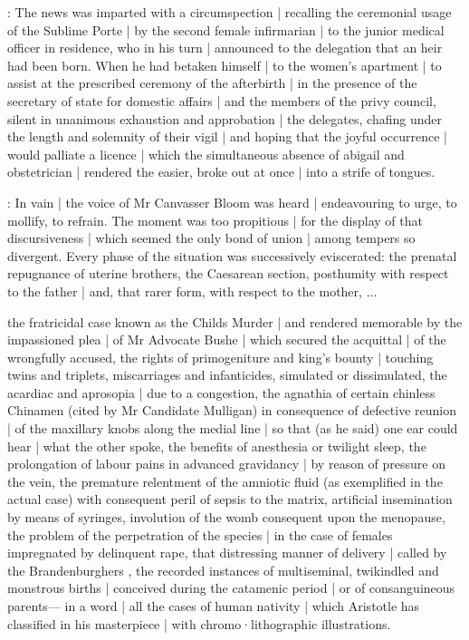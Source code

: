 

:
The news was imparted with a circumspection |
recalling the ceremonial usage of the Sublime Porte |
by the second female infirmarian |
to the junior medical officer in residence,
who in his turn |
announced to the delegation
that an heir had been born.
When he had betaken himself |
to the women's apartment |
to assist at the prescribed ceremony of the afterbirth |
in the presence of the secretary of state for domestic affairs |
and the members of the privy council,
silent in unanimous exhaustion and approbation |
the delegates,
chafing under the length and solemnity of their vigil |
and hoping that the joyful occurrence |
would palliate a licence |
which the simultaneous absence of abigail and obstetrician |
rendered the easier,
broke out at once |
into a strife of tongues.

:
In vain |
the voice of Mr Canvasser Bloom was heard |
endeavouring to urge,
to mollify,
to refrain.
The moment was too propitious |
for the display of that discursiveness |
which seemed the only bond of union |
among tempers so divergent.
Every phase of the situation was successively eviscerated:
the prenatal repugnance of uterine brothers,
the Caesarean section,
posthumity with respect to the father |
and,
that rarer form,
with respect to the mother,
...

\begin{omitted}
the fratricidal case known as the Childs Murder |
and rendered memorable by the impassioned plea |
of Mr Advocate Bushe |
which secured the acquittal |
of the wrongfully accused,
the rights of primogeniture and king's bounty |
touching twins and triplets,
miscarriages and infanticides,
simulated or dissimulated,
the acardiac  and aprosopia |
due to a congestion,
the agnathia of certain chinless Chinamen
(cited by Mr Candidate Mulligan)
in consequence of defective reunion |
of the maxillary knobs along the medial line |
so that
(as he said)
one ear could hear |
what the other spoke,
the benefits of anesthesia or twilight sleep,
the prolongation of labour pains in advanced gravidancy |
by reason of pressure on the vein,
the premature relentment of the amniotic fluid
(as exemplified in the actual case)
with consequent peril of sepsis to the matrix,
artificial insemination by means of syringes,
involution of the womb consequent upon the menopause,
the problem of the perpetration of the species |
in the case of females impregnated by delinquent rape,
that distressing manner of delivery |
called by the Brandenburghers ,
the recorded instances of multiseminal,
twikindled and monstrous births |
conceived during the catamenic period |
or of consanguineous parents---%
in a word |
all the cases of human nativity |
which Aristotle has classified in his masterpiece |
with chromo·lithographic illustrations.
\end{omitted}


